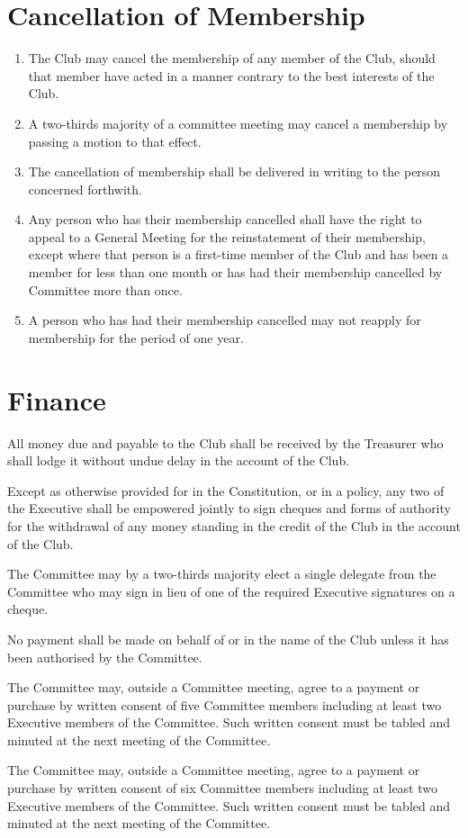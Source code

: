 \documentclass[11pt]{article} %
\begin{document}
\section{Cancellation of Membership}
\begin{enumerate}
\item The Club may cancel the membership of any member of the Club, should that member have acted in a manner contrary to the best interests of the Club.
\item A two-thirds majority of a committee meeting may cancel a membership by passing a motion to that effect.
\item The cancellation of membership shall be delivered in writing to the person concerned forthwith.
\item Any person who has their membership cancelled shall have the right to appeal to a General Meeting for the reinstatement of their membership, except where that person is a first-time member of the Club and has been a member for less than one month or has had their membership cancelled by Committee more than once.
\item A person who has had their membership cancelled may not reapply for membership for the period of one year.
\end{enumerate}

\section{Finance}
\begin{enumerate}
	\item All money due and payable to the Club shall be received by the Treasurer who shall lodge it without undue delay in the account of the Club.
	\item Except as otherwise provided for in the Constitution, or in a policy, any two of the Executive shall be empowered jointly to sign cheques and forms of authority for the withdrawal of any money standing in the credit of the Club in the account of the Club.
	\item The Committee may by a two-thirds majority elect a single delegate from the Committee who may sign in lieu of one of the required Executive signatures on a cheque.
	\item No payment shall be made on behalf of or in the name of the Club unless it has been authorised by the Committee.
	{\color{red}\item The Committee may, outside a Committee meeting, agree to a payment or purchase by written consent of five Committee members including at least two Executive members of the Committee. Such written consent must be tabled and minuted at the next meeting of the Committee.}
	{\color{ForestGreen}\item The Committee may, outside a Committee meeting, agree to a payment or purchase by written consent of six Committee members including at least two Executive members of the Committee. Such written consent must be tabled and minuted at the next meeting of the Committee.}
\end{enumerate}
\end{document}
